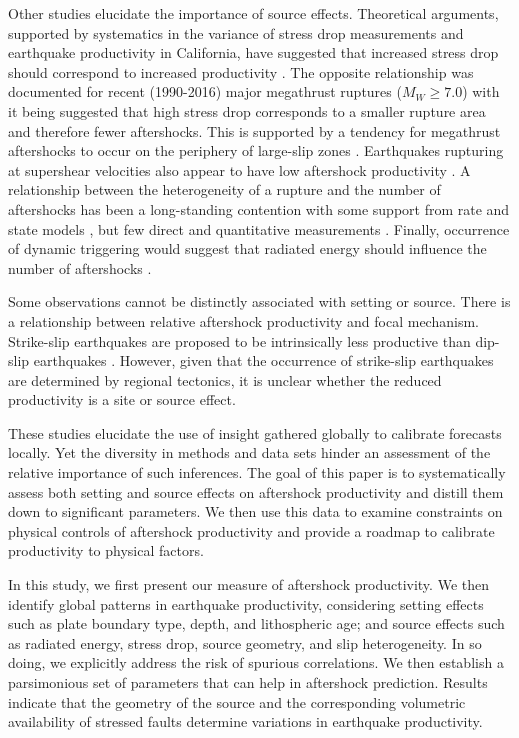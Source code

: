 \documentclass[draft, jgrga]{agujournal2018}
\begin{document}
Other studies elucidate the importance of source effects. Theoretical arguments, supported by systematics in the variance of stress drop measurements and earthquake productivity in California, have suggested that increased stress drop should correspond to increased productivity \citep{Marsan2017HowAftershocks}. The opposite relationship was documented for recent (1990-2016) major megathrust ruptures ($M_W \ge 7.0$) \citep{Wetzler2016} with it being suggested that high stress drop corresponds to a smaller rupture area and therefore fewer aftershocks. This is supported by a tendency for megathrust aftershocks to occur on the periphery of large-slip zones \citep{Wetzler2016}. Earthquakes rupturing at supershear velocities also appear to have low aftershock productivity \citep{Bouchon2008TheEarthquakes}. A relationship between the heterogeneity of a rupture and the number of aftershocks has been a long-standing contention \citep{Mogi1967, Yamanaka1990scalingshock} with some support from rate and state models \citep{Helmstetter2006RelationModel, Marsan2006}, but few direct and quantitative measurements \citep{Das2003SpatialDistribution, Houston2004}. Finally, occurrence of dynamic triggering would suggest that radiated energy should influence the number of aftershocks \citep{felzer2006decay}.  

Some observations cannot be distinctly associated with setting or source. There is a relationship between relative aftershock productivity and focal mechanism. Strike-slip earthquakes are proposed to be intrinsically less productive than dip-slip earthquakes \citep{Tahir2012, Tahir2014Aftershock2005, Tahir2015}. However, given that the occurrence of strike-slip earthquakes are determined by regional tectonics, it is unclear whether the reduced productivity is a site or source effect.

These studies elucidate the use of insight gathered globally to calibrate forecasts locally. Yet the diversity in methods and data sets hinder an assessment of the relative importance of such inferences. The goal of this paper is to systematically assess both setting and source effects on aftershock productivity and distill them down to significant parameters. We then use this data to examine constraints on physical controls of aftershock productivity and provide a roadmap to calibrate productivity to physical factors. 

In this study, we first present our measure of aftershock productivity. We then identify global patterns in earthquake productivity, considering setting effects such as plate boundary type, depth, and lithospheric age; and source effects such as radiated energy, stress drop, source geometry, and slip heterogeneity. In so doing, we explicitly address the risk of spurious correlations. We then establish a parsimonious set of parameters that can help in aftershock prediction. Results indicate that the geometry of the source and the corresponding volumetric availability of stressed faults determine variations in earthquake productivity.
\end{document}
